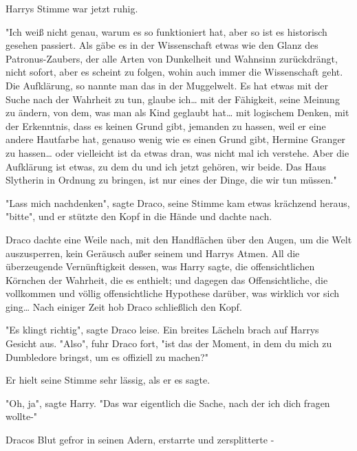 {Harrys Stimme war jetzt ruhig.

"Ich weiß nicht genau, warum es so funktioniert hat, aber so ist es historisch gesehen passiert. Als gäbe es in der Wissenschaft etwas wie den Glanz des Patronus-Zaubers, der alle Arten von Dunkelheit und Wahnsinn zurückdrängt, nicht sofort, aber es scheint zu folgen, wohin auch immer die Wissenschaft geht. Die Aufklärung, so nannte man das in der Muggelwelt. Es hat etwas mit der Suche nach der Wahrheit zu tun, glaube ich… mit der Fähigkeit, seine Meinung zu ändern, von dem, was man als Kind geglaubt hat… mit logischem Denken, mit der Erkenntnis, dass es keinen Grund gibt, jemanden zu hassen, weil er eine andere Hautfarbe hat, genauso wenig wie es einen Grund gibt, Hermine Granger zu hassen… oder vielleicht ist da etwas dran, was nicht mal ich verstehe. Aber die Aufklärung ist etwas, zu dem du und ich jetzt gehören, wir beide. Das Haus Slytherin in Ordnung zu bringen, ist nur eines der Dinge, die wir tun müssen."

"Lass mich nachdenken", sagte Draco, seine Stimme kam etwas krächzend heraus, "bitte", und er stützte den Kopf in die Hände und dachte nach.

Draco dachte eine Weile nach, mit den Handflächen über den Augen, um die Welt auszusperren, kein Geräusch außer seinem und Harrys Atmen. All die überzeugende Vernünftigkeit dessen, was Harry sagte, die offensichtlichen Körnchen der Wahrheit, die es enthielt; und dagegen das Offensichtliche, die vollkommen und völlig offensichtliche Hypothese darüber, was wirklich vor sich ging… Nach einiger Zeit hob Draco schließlich den Kopf.

"Es klingt richtig", sagte Draco leise. Ein breites Lächeln brach auf Harrys Gesicht aus. "Also", fuhr Draco fort, "ist das der Moment, in dem du mich zu Dumbledore bringst, um es offiziell zu machen?"

Er hielt seine Stimme sehr lässig, als er es sagte.

"Oh, ja", sagte Harry. "Das war eigentlich die Sache, nach der ich dich fragen wollte-"

Dracos Blut gefror in seinen Adern, erstarrte und zersplitterte -

}
